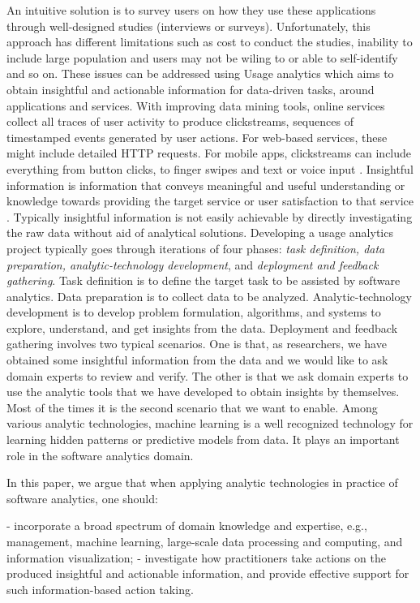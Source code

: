 An intuitive solution is to survey users on how they use these applications through well-designed studies (interviews or surveys). Unfortunately, this approach has different limitations such as cost to conduct the studies, inability to include large population and users may not be wiling to or able to self-identify and so on. These issues can be addressed using Usage analytics which aims to obtain insightful and actionable information for data-driven tasks, around applications and services. With improving data mining tools, online services collect all traces of user activity to produce clickstreams, sequences of timestamped events generated by user actions. For web-based services, these might include detailed HTTP requests. For mobile apps, clickstreams can include everything from button clicks, to finger swipes and text or voice input \cite{Wang2016}. Insightful information is information that conveys meaningful and useful understanding or knowledge towards providing the target service or user satisfaction to that service \cite{Zhang2011}. Typically insightful information is not easily achievable by directly investigating the raw data without aid of analytical solutions. Developing a usage analytics project typically goes through iterations of four phases: \emph{task definition, data preparation, analytic-technology development}, and \emph{deployment and feedback gathering}. Task definition is to define the target task to be assisted by software analytics. Data preparation is to collect data to be analyzed. Analytic-technology development is to develop problem formulation, algorithms, and systems to explore, understand, and get insights from the data. Deployment and feedback gathering involves two typical scenarios. One is that, as researchers, we have obtained some insightful information from the data and we would like to ask domain experts to review and verify. The other is that we ask domain experts to use the analytic tools that we have developed to obtain insights by themselves. Most of the times it is the second scenario that we want to enable. Among various analytic technologies, machine learning is a well recognized technology for learning hidden patterns or predictive models from data. It plays an important role in the software analytics domain. 

In this paper, we argue that when applying analytic technologies in practice of software analytics, one should:

- incorporate a broad spectrum of domain knowledge and expertise, e.g., management, machine learning, large-scale data processing and computing, and information visualization;
- investigate how practitioners take actions on the produced insightful and actionable information, and provide effective support for such information-based action taking.

